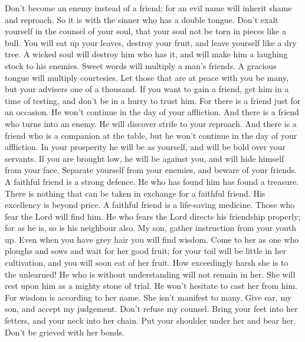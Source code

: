  Don't become an enemy instead of a friend; for an evil name
will inherit shame and reproach. So it is with the sinner who has a
double tongue.  Don't exalt yourself in the counsel of your
soul, that your soul not be torn in pieces like a bull.  You
will eat up your leaves, destroy your fruit, and leave yourself like a
dry tree.  A wicked soul will destroy him who has it, and
will make him a laughing stock to his enemies.  Sweet words
will multiply a man's friends. A gracious tongue will multiply
courtesies.  Let those that are at peace with you be many,
but your advisers one of a thousand.  If you want to gain a
friend, get him in a time of testing, and don't be in a hurry to trust
him.  For there is a friend just for an occasion. He won't
continue in the day of your affliction.  And there is a
friend who turns into an enemy. He will discover strife to your
reproach.  And there is a friend who is a companion at the
table, but he won't continue in the day of your affliction.
 In your prosperity he will be as yourself, and will be
bold over your servants.  If you are brought low, he will
be against you, and will hide himself from your face. 
Separate yourself from your enemies, and beware of your friends.
 A faithful friend is a strong defence. He who has found
him has found a treasure.  There is nothing that can be
taken in exchange for a faithful friend. His excellency is beyond price.
 A faithful friend is a life-saving medicine. Those who
fear the Lord will find him.  He who fears the Lord directs
his friendship properly; for as he is, so is his neighbour also.
 My son, gather instruction from your youth up. Even when
you have grey hair you will find wisdom.  Come to her as
one who ploughs and sows and wait for her good fruit; for your toil will
be little in her cultivation, and you will soon eat of her fruit.
 How exceedingly harsh she is to the unlearned! He who is
without understanding will not remain in her.  She will
rest upon him as a mighty stone of trial. He won't hesitate to cast her
from him.  For wisdom is according to her name. She isn't
manifest to many.  Give ear, my son, and accept my
judgement. Don't refuse my counsel.  Bring your feet into
her fetters, and your neck into her chain.  Put your
shoulder under her and bear her. Don't be grieved with her bonds.
